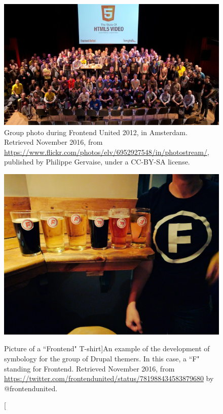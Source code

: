 \begin{figure}[H]
\centering
\includegraphics[scale=0.6]{img/online/group-photo_fu_2012.jpg}
\caption[Group photo during Frontend United 2012]%
{Group photo during Frontend United 2012, in Amsterdam. Retrieved  November 2016, from \url{https://www.flickr.com/photos/elv/6952927548/in/photostream/}, published by Philippe Gervaise, under a CC-BY-SA license.}
\label{frontend-united-2012}
\end{figure}

\begin{figure}[H]
  \centering
\includegraphics[scale=0.3]{img/online/fe-united-logo.jpeg}
\caption[Picture of a ``Frontend" T-shirt]{An example of the development of symbology for the group of Drupal themers. In this case, a ``F" standing for Frontend. Retrieved  November 2016, from \url{https://twitter.com/frontendunited/status/781988434583879680} by @frontendunited.}
\label{frontend-united-symbol}
\end{figure}

